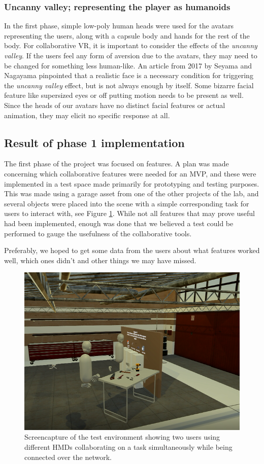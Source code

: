 \subsubsection{Uncanny valley; representing the player as humanoids}
In the first phase, simple low-poly human heads were used for the avatars representing the users, along with a capsule body and hands for the rest of the body. For collaborative VR, it is important to consider the effects of the \textit{uncanny valley}\cite{mori2012uncanny}. If the users feel any form of aversion due to the avatars, they may need to be changed for something less human-like. An article from 2017 by Seyama and Nagayama \cite{seyama2007uncanny} pinpointed that a realistic face is a necessary condition for triggering the \textit{uncanny valley} effect, but is not always enough by itself. Some bizarre facial feature like supersized eyes or off putting motion needs to be present as well. Since the heads of our avatars have no distinct facial features or actual animation, they may elicit no specific response at all.

\subsection{Result of phase 1 implementation}
The first phase of the project was focused on features. A plan was made concerning which collaborative features were needed for an MVP, and these were implemented in a test space made primarily for prototyping and testing purposes. This was made using a garage asset from one of the other projects of the lab, and several objects were placed into the scene with a simple corresponding task for users to interact with, see Figure \ref{fig:phase1Capture1}. While not all features that may prove useful had been implemented, enough was done that we believed a test could be performed to gauge the usefulness of the collaborative tools. 

Preferably, we hoped to get some data from the users about what features worked well, which ones didn't and other things we may have missed.


\begin{figure}
    \centering
    \captionsetup{width=.7\linewidth}
    \includegraphics[width=.7\textwidth]{./fig/phase_1/phase1_capture2.PNG}
    \caption{Screencapture of the test environment showing two users using different HMDs collaborating on a task simultaneously while being connected over the network.}
    \label{fig:phase1Capture1}
\end{figure}


